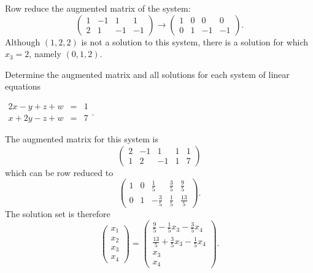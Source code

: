 \documentclass{ximera}
\begin{document}
\begin{exercise}
\begin{solution}
\soln Row reduce the augmented matrix of the system:
\[
\left(\begin{array}{rrr|r} 1 & -1 & 1 & 1 \\ 2 & 1 & -1 & -1\end{array}\right)
\longrightarrow
\left(\begin{array}{rrr|r} 1 & 0 & 0 & 0 \\ 0 & 1 & -1 & -1\end{array}\right).
\]
Although $(1,2,2)$ is not a solution to this system, there is a solution
for which $x_3 = 2$, namely $(0,1,2)$.

\end{solution}
\end{exercise}

\problemlabel

\noindent Determine the augmented matrix and all solutions for each system of linear equations

\begin{exercise} \label{c2.3.10b}
$\begin{array}{rcl}
2x-y+z+w & = & 1\\
   x+2y-z+w & = & 7 \end{array}$.

\begin{solution}
The augmented matrix for this system is
\[
\left(\begin{array}{rrrr|r} 2 & -1 & 1 & 1 & 1 \\ 1 & 2 & -1 & 1 & 7
\end{array}\right)
\]
which can be row reduced to
\[
\left(\begin{array}{rrrr|r} 1 & 0 & \frac{1}{5} & \frac{3}{5} &
\frac{9}{5} \\ 0 & 1 & -\frac{3}{5} & \frac{1}{5} & \frac{13}{5}
\end{array}\right).
\]
The solution set is therefore
\[
\left(\begin{array}{c} x_1 \\ x_2 \\ x_3 \\ x_4\end{array}\right) =
\left(\begin{array}{c} \frac{9}{5} - \frac{1}{5}x_3 - \frac{3}{5}x_4
\\ \frac{13}{5} + \frac{3}{5}x_3 - \frac{1}{5}x_4 \\ x_3 \\ x_4
\end{array}\right).
\]

\end{solution}
\end{exercise}
\end{document}
